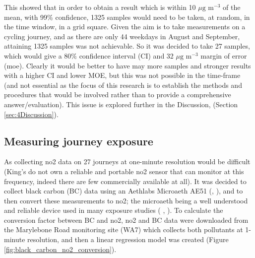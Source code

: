 This showed that in order to obtain a result which is within 10 $\mu \text{g m}^{-3}$ of the mean, with 99\% confidence, 1325 samples would need to be taken, at random, in the time window, in a grid square. Given the aim is to take measurements on a cycling journey, and as there are only 44 weekdays in August and September, attaining 1325 samples was not achievable. So it was decided to take 27 samples, which would give a 80\% confidence interval (CI) and 32 $\mu \text{g m}^{-3}$ margin of error (\gls{moe}). Clearly it would be better to have may more samples and stronger results with a higher CI and lower MOE, but this was not possible in the time-frame (and not essential as the focus of this research is to establish the methods and procedures that would be involved rather than to provide a comprehensive answer/evaluation). This issue is explored further in the Discussion, (Section \ref{sec:4Discussion}).

\subsection{Measuring journey exposure}
\label{subsec:measuringjourneyexposure}

As collecting \gls{no2} data on 27 journeys at one-minute resolution would be difficult (King’s do not own a reliable and portable \gls{no2} sensor that can monitor at this frequency, indeed there are few commercially available at all). It was decided to collect black carbon (BC) data using an Aethlabs Microaeth AE51 (\cite{Hansen1984}, \cite{Aethlabs2016}), and to then convert these measurements to \gls{no2}; the microaeth being a well understood and reliable device used in many exposure studies ( \cite{Cheng2013}, \cite{Viana2015} ). To calculate the conversion factor between BC and \gls{no2}, \gls{no2} and BC data were downloaded from the Marylebone Road monitoring site (WA7) which collects both pollutants at 1-minute resolution, and then a linear regression model was created (Figure \ref{fig:black_carbon_no2_conversion}). 

